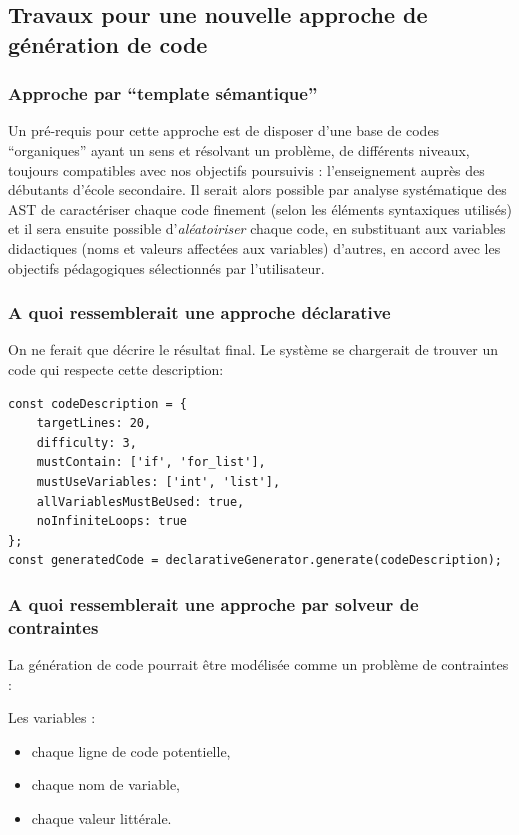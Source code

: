 \documentclass[11pt,a4paper]{article}
\begin{document}
\subsection{Travaux pour une nouvelle approche de génération de code}

\subsubsection*{Approche par ``template sémantique''}
Un pré-requis pour cette approche est de disposer d'une base de codes ``organiques'' ayant un sens et résolvant un problème, de différents niveaux, toujours compatibles avec nos objectifs poursuivis : l'enseignement auprès des débutants d'école secondaire. Il serait alors possible par analyse systématique des AST de caractériser chaque code finement (selon les éléments syntaxiques utilisés) et il sera ensuite possible d'\textit{aléatoiriser} chaque code, en substituant aux variables didactiques (noms et valeurs affectées aux variables) d'autres, en accord avec les objectifs pédagogiques sélectionnés par l'utilisateur.

\subsubsection*{A quoi ressemblerait une approche déclarative}
On ne ferait que décrire le résultat final. Le système se chargerait de trouver un code qui respecte cette description:
 
 \begin{verbatim}
const codeDescription = {
    targetLines: 20,
    difficulty: 3,
    mustContain: ['if', 'for_list'],
    mustUseVariables: ['int', 'list'],
    allVariablesMustBeUsed: true,
    noInfiniteLoops: true
};
const generatedCode = declarativeGenerator.generate(codeDescription);
\end{verbatim}

\subsubsection*{A quoi ressemblerait une approche par solveur de contraintes}
La génération de code pourrait être modélisée comme un problème de contraintes :

Les variables :
\begin{itemize}
    \item chaque ligne de code potentielle, 
    \item chaque nom de variable, 
    \item chaque valeur littérale.
\end{itemize}
\end{document}
